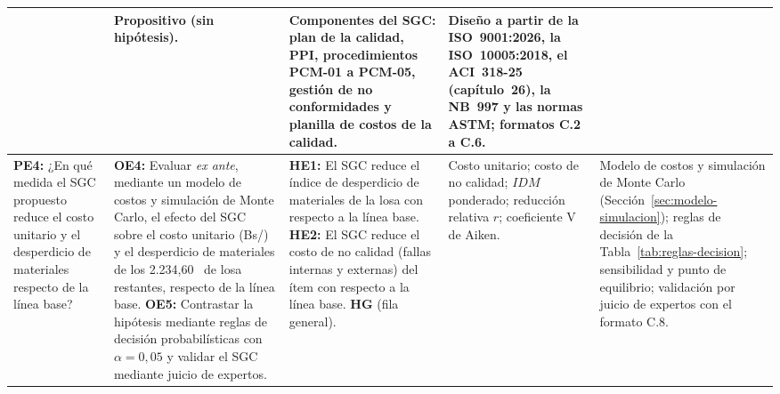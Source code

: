 \begin{landscape}
\begin{longtable}{@{}P{4.4cm}P{4.4cm}P{4.6cm}P{4.0cm}P{4.3cm}@{}}
& Propositivo (sin hipótesis).
& Componentes del SGC: plan de la calidad, PPI, procedimientos PCM-01 a PCM-05, gestión de no conformidades y planilla de costos de la calidad.
& Diseño a partir de la ISO~9001:2026, la ISO~10005:2018, el ACI~318-25 (capítulo~26), la NB~997 y las normas ASTM; formatos C.2 a C.6. \\
\midrule
\textbf{PE4:} ¿En qué medida el SGC propuesto reduce el costo unitario y el desperdicio de materiales respecto de la línea base?
& \textbf{OE4:} Evaluar \emph{ex ante}, mediante un modelo de costos y simulación de Monte Carlo, el efecto del SGC sobre el costo unitario (Bs/\mdos{}) y el desperdicio de materiales de los 2.234,60~\mdos{} de losa restantes, respecto de la línea base. \newline \textbf{OE5:} Contrastar la hipótesis mediante reglas de decisión probabilísticas con $\alpha = 0{,}05$ y validar el SGC mediante juicio de expertos.
& \textbf{HE1:} El SGC reduce el índice de desperdicio de materiales de la losa con respecto a la línea base. \newline \textbf{HE2:} El SGC reduce el costo de no calidad (fallas internas y externas) del ítem con respecto a la línea base. \newline \textbf{HG} (fila general).
& Costo unitario; costo de no calidad; $IDM$ ponderado; reducción relativa $r$; coeficiente V de Aiken.
& Modelo de costos y simulación de Monte Carlo (Sección~\ref{sec:modelo-simulacion}); reglas de decisión de la Tabla~\ref{tab:reglas-decision}; sensibilidad y punto de equilibrio; validación por juicio de expertos con el formato C.8. \\
\end{longtable}
\endgroup
{}


\end{landscape}
